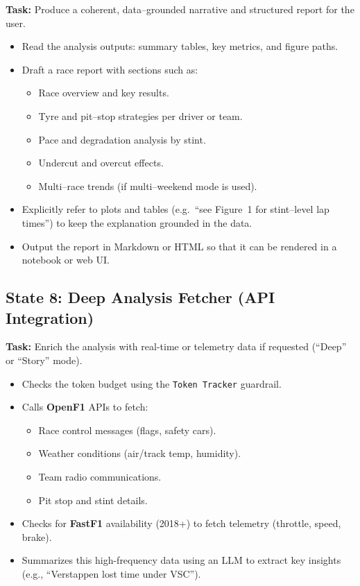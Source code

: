 \documentclass[11pt]{article}
\begin{document}
\textbf{Task:} Produce a coherent, data–grounded narrative and structured report for the user.

\begin{itemize}[leftmargin=1.5em]
    \item Read the analysis outputs: summary tables, key metrics, and figure paths.
    \item Draft a race report with sections such as:
    \begin{itemize}
        \item Race overview and key results.
        \item Tyre and pit–stop strategies per driver or team.
        \item Pace and degradation analysis by stint.
        \item Undercut and overcut effects.
        \item Multi–race trends (if multi–weekend mode is used).
    \end{itemize}
    \item Explicitly refer to plots and tables (e.g.\ ``see Figure~1 for stint–level lap times'') to keep the explanation grounded in the data.
    \item Output the report in Markdown or HTML so that it can be rendered in a notebook or web UI.
\end{itemize}

\subsection*{State 8: Deep Analysis Fetcher (API Integration)}

\textbf{Task:} Enrich the analysis with real-time or telemetry data if requested (``Deep'' or ``Story'' mode).

\begin{itemize}[leftmargin=1.5em]
    \item Checks the token budget using the \texttt{Token Tracker} guardrail.
    \item Calls \textbf{OpenF1} APIs to fetch:
    \begin{itemize}
        \item Race control messages (flags, safety cars).
        \item Weather conditions (air/track temp, humidity).
        \item Team radio communications.
        \item Pit stop and stint details.
    \end{itemize}
    \item Checks for \textbf{FastF1} availability (2018+) to fetch telemetry (throttle, speed, brake).
    \item Summarizes this high-frequency data using an LLM to extract key insights (e.g., ``Verstappen lost time under VSC'').
\end{itemize}
\end{document}
